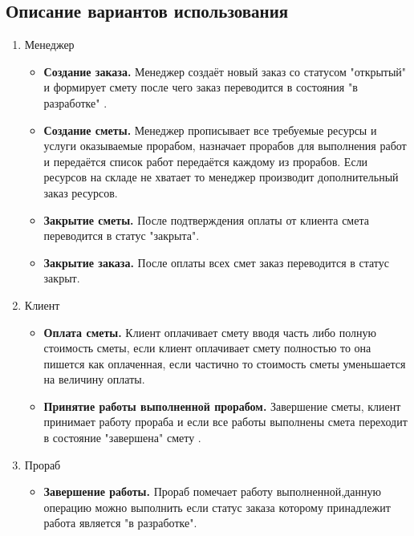 \subsection{Описание вариантов использования}
\begin{enumerate}
\item Менеджер
	\begin{itemize}
		\item \textbf{Создание заказа.}
Менеджер создаёт новый заказ со статусом "открытый" и формирует смету после чего заказ переводится в состояния "в разработке" .
		\item \textbf{Создание сметы.} Менеджер прописывает все требуемые ресурсы и услуги оказываемые прорабом,
назначает прорабов для выполнения работ и передаётся список работ передаётся каждому из прорабов. Если ресурсов на складе не хватает то менеджер производит дополнительный заказ ресурсов.
		\item \textbf{Закрытие сметы.} После подтверждения оплаты от клиента смета переводится в статус "закрыта".
		\item \textbf{Закрытие заказа.} После оплаты всех смет заказ переводится в статус закрыт.
	\end{itemize}
\item Клиент
	\begin{itemize}
	\item \textbf{Оплата сметы.} Клиент оплачивает смету вводя часть либо полную стоимость сметы, если клиент оплачивает смету полностью то она пишется как оплаченная, если частично то стоимость сметы уменьшается на величину оплаты.
	\item \textbf{Принятие работы выполненной прорабом.} Завершение сметы, клиент принимает работу прораба и если все работы выполнены смета переходит в состояние "завершена" смету .
	\end{itemize}
\item Прораб
	\begin{itemize}
	\item \textbf{Завершение работы.} Прораб помечает работу выполненной,данную операцию можно выполнить если статус заказа которому принадлежит работа является "в разработке".
	\end{itemize}
\end{enumerate}
\newpage
